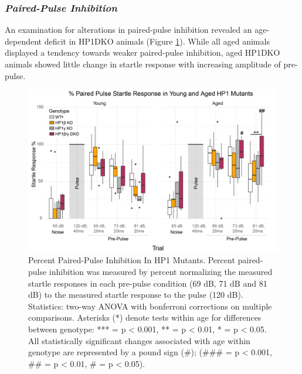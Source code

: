 \documentclass[onehalf,12pt]{beavtex}
\begin{document}
  \FloatBarrier
  
  \subsubsection*{\texorpdfstring{\emph{Paired-Pulse
  Inhibition}}{Paired-Pulse Inhibition}}\label{paired-pulse-inhibition}
  
  An examination for alterations in paired-pulse inhibition revealed an
  age-dependent deficit in HP1DKO animals (Figure \ref{fig:PPI}). While
  all aged animals displayed a tendency towards weaker paired-pulse
  inhibition, aged HP1DKO animals showed little change in startle response
  with increasing amplitude of pre-pulse.
  
  \begin{figure}
  
  {\centering \includegraphics[width=1\linewidth, ]{./figure/results/PPI} 
  
  }
  
  \caption[Percent Paired-Pulse Inhibition In HP1 Mutants]{Percent Paired-Pulse Inhibition In HP1 Mutants.  Percent paired-pulse inhibition was measured by percent normalizing the measured startle responses in each pre-pulse condition (69 dB, 71 dB and 81 dB) to the measured startle response to the pulse (120 dB). Statistics: two-way ANOVA with bonferroni corrections on multiple comparisons. Asterisks (*) denote tests within age for differences between genotype: *** = p < 0.001, ** = p < 0.01, * = p < 0.05. All statistically significant changes associated with age within genotype are represented by a pound sign (\#); (\#\#\# = p < 0.001, \#\# = p < 0.01, \# = p < 0.05).}\label{fig:PPI}
  \end{figure}
  
\end{document}
